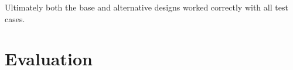 \documentclass[10pt]{article}
\begin{document}
Ultimately both the base and alternative designs worked correctly with all test cases.  \\


\section{Evaluation}




\end{document}
